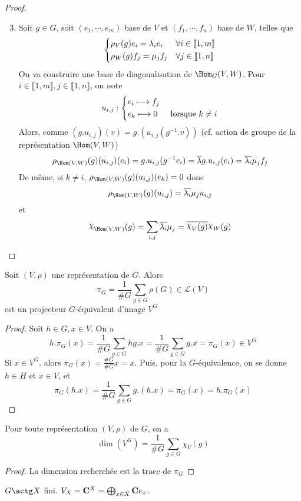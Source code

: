 \begin{proof}
\begin{enumerate}
    \setcounter{enumi}{2}
\item Soit $g \in  G$, soit $(e_1, \cdots , e_m)$ base de $V$ et  $(f_1, \cdots , f_n)$ base de $W$, telles que  \[
\begin{dcases}
    \rho_V(g)e_i=\lambda_i e_i & \forall  i \in  \llbracket 1, m \rrbracket \\
    \rho_W(g)f_j=\mu_jf_j & \forall  j \in  \llbracket 1, n \rrbracket 
\end{dcases}
\] 
On va construire une base de diagonalisation de $\Hom_G(V, W)$. Pour $i \in  \llbracket 1,m \rrbracket , j \in  \llbracket 1,n \rrbracket $, on note \[
u_{i,j}: \begin{dcases}
    e_i\longmapsto f_j\\
    e_k \longmapsto 0 & \text{ lorsque }k\neq i
\end{dcases}
\]
Alors, comme $(g.u_{i,j})(v)=g.(u_{i,j}(g^{-1}.v))$ (cf. action de groupe de la représentation $\Hom(V, W)$) \[
    \rho_{\Hom(V, W)}(g)(u_{i,j})(e_i)=g.u_{i,j}(g^{-1}e_i)=\bar{\lambda} g.u_{i,j}(e_i)=\bar{\lambda_i}\mu_j f_j
\]
De même, si $k\neq i$,  $\rho_{\Hom(V, W)}(g)(u_{i,j})(e_k)=0$ donc \[\rho_{\Hom(V, W)}(g)(u_{i,j})=\bar{\lambda_i}\mu_ju_{i,j}\] et \[
\chi_{\Hom(V, W)}(g)=\sum_{i,j}\bar{\lambda_i}\mu_j=\bar{\chi_V(g)}\chi_W(g)
\] 
\end{enumerate}
\end{proof}

\begin{prop}
    Soit $(V, \rho)$ une représentation de  $G$. Alors  \[
        \pi_G=\frac1{\#G} \sum_{g \in  G}\rho(G) \in  \mathcal  L(V)
    \] 
    est un projecteur $G$-équivalent d'image  $V^G$
\end{prop}

\begin{proof}
    Soit  $h \in  G, x \in  V$. On a \[
        h.\pi_G(x)=\frac1{\#G}\sum_{g \in  G}hg.x=\frac1{\#G}\sum_{g \in  G}g.x=\pi_G(x) \in V^G
    \] 
    Si $x \in  V^G$, alors $\pi_G(x)=\frac{\#G}{\#G}x=x$. Puis, pour la  $G$-équivalence, on se donne  $h \in  H$ et $x \in  V$, et \[
        \pi_G(h.x)=\frac1{\#G}\sum_{g \in  G}g.(h.x)=\pi_G(x)=h.\pi_G(x)
    \] 
\end{proof}

\begin{cor}
    Pour toute représentation $(V, \rho)$ de $G$, on a \[
        \dim(V^G)=\frac1{\#G}\sum_{g \in  G}\chi_V(g)
    \] 
\end{cor}

\begin{proof}
La dimension recherchée est la trace de $\pi_G$
\end{proof}

\begin{ex}
$G\actg X$ fini.  $V_X=\mathbf C^X=\bigoplus_{x \in  X}\mathbf C e_x$. %
\end{ex}

